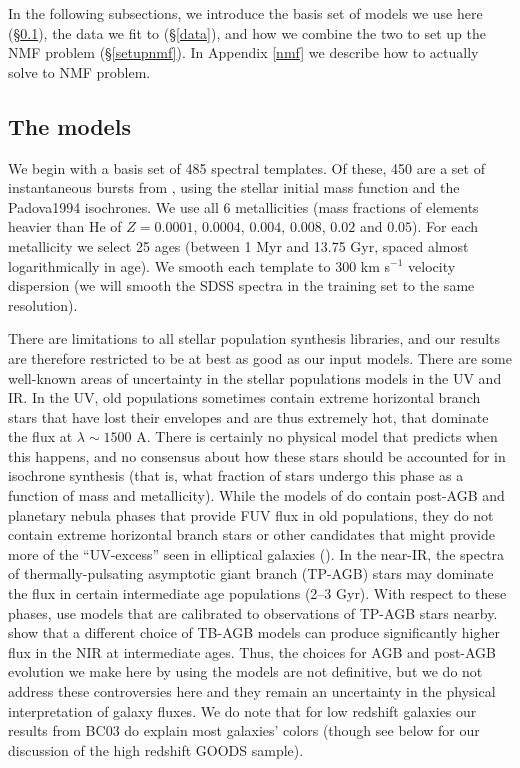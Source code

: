 \documentclass[10pt,preprint]{aastex}
\renewcommand{\AA}{A}
\newcounter{address}
\begin{document}
In the following subsections, we introduce the basis set of models we
use here (\S\ref{models}), the data we fit to (\S\ref{data}), and how
we combine the two to set up the NMF problem (\S\ref{setupnmf}).  In
Appendix \ref{nmf} we describe how to actually solve to NMF problem.

\subsection{The models}
\label{models}

We begin with a basis set of 485 spectral templates. Of these, 450 are
a set of instantaneous bursts from \citet{bruzual03a}, using the
\citet{chabrier03a} stellar initial mass function and the Padova1994
isochrones. We use all 6 metallicities (mass fractions of elements
heavier than He of $Z= 0.0001$, $0.0004$, $0.004$, $0.008$, $0.02$ and
$0.05$).  For each metallicity we select 25 ages (between 1 Myr and
13.75 Gyr, spaced almost logarithmically in age).  We smooth each
template to $300$ km s$^{-1}$ velocity dispersion (we will smooth the
SDSS spectra in the training set to the same resolution).

There are limitations to all stellar population synthesis libraries,
and our results are therefore restricted to be at best as good as our
input models. There are some well-known areas of uncertainty in the
stellar populations models in the UV and IR. In the UV, old
populations sometimes contain extreme horizontal branch stars that
have lost their envelopes and are thus extremely hot, that dominate
the flux at $\lambda \sim 1500$ \AA. There is certainly no physical
model that predicts when this happens, and no consensus about how
these stars should be accounted for in isochrone synthesis (that is,
what fraction of stars undergo this phase as a function of mass and
metallicity). While the models of \cite{bruzual03a} do contain
post-AGB and planetary nebula phases that provide FUV flux in old
populations, they do not contain extreme horizontal branch stars or
other candidates that might provide more of the ``UV-excess'' seen in
elliptical galaxies (\citealt{greggio90a, brown00a}).  In the near-IR,
the spectra of thermally-pulsating asymptotic giant branch (TP-AGB)
stars may dominate the flux in certain intermediate age populations
(2--3 Gyr). With respect to these phases, \citet{bruzual03a} use
models that are calibrated to observations of TP-AGB stars
nearby. \citet{maraston05a} show that a different choice of TB-AGB
models can produce significantly higher flux in the NIR at
intermediate ages. Thus, the choices for AGB and post-AGB evolution we
make here by using the models \cite{bruzual03a} are not definitive,
but we do not address these controversies here and they remain an
uncertainty in the physical interpretation of galaxy fluxes.  We do
note that for low redshift galaxies our results from BC03 do explain
most galaxies' colors (though see below for our discussion of the high
redshift GOODS sample).
\end{document}
